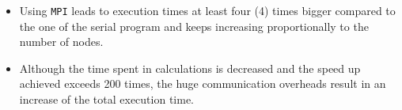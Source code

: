 \documentclass{article}
\begin{document}
\begin{itemize}
 \item Using \texttt{MPI} leads to execution times at least four (4) times bigger compared
       to the one of the serial program and keeps increasing proportionally to the number
       of nodes.
 \item Although the time spent in calculations is decreased and the speed up achieved
       exceeds 200 times, the huge communication overheads result in an increase of the total
       execution time.
\end{itemize}
\end{document}
